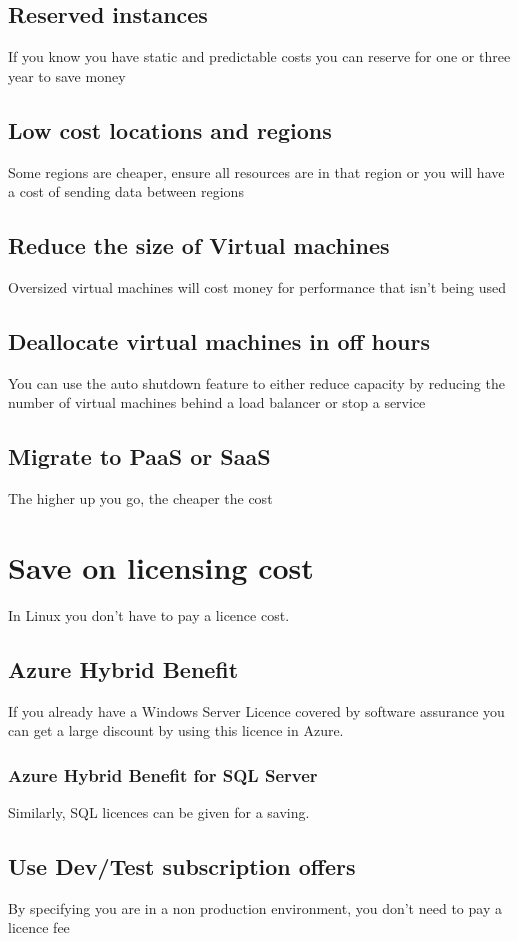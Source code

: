 \documentclass{article}[18pt]
\begin{document}
\subsection{Reserved instances}
If you know you have static and predictable costs you can reserve for one or three year to save money
\subsection{Low cost locations and regions}
Some regions are cheaper, ensure all resources are in that region or you will have a cost of sending data between regions
\subsection{Reduce the size of Virtual machines}
Oversized virtual machines will cost money for performance that isn't being used
\subsection{Deallocate virtual machines in off hours}
You can use the auto shutdown feature to either reduce capacity by reducing the number of virtual machines behind a load balancer or stop a service
\subsection{Migrate to PaaS or SaaS}
The higher up you go, the cheaper the cost
\section{Save on licensing cost}
In Linux you don't have to pay a licence cost.
\subsection{Azure Hybrid Benefit}
If you already have a Windows Server Licence covered by software assurance you can get a large discount by using this licence in Azure.
\subsubsection{Azure Hybrid Benefit for SQL Server}
Similarly, SQL licences can be given for a saving.
\subsection{Use Dev/Test subscription offers}
By specifying you are in a non production environment, you don't need to pay a licence fee
\end{document}

